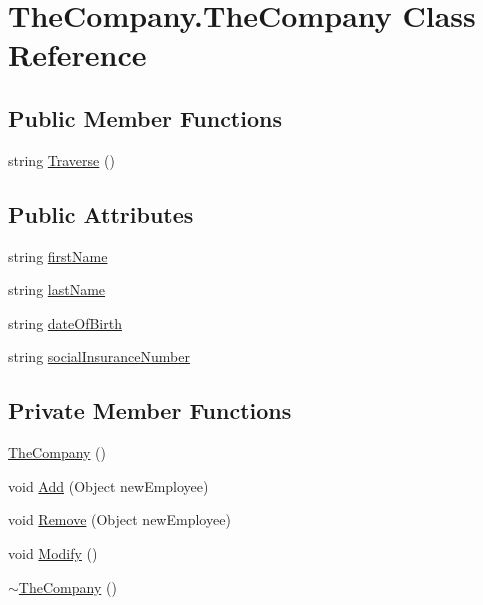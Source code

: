\hypertarget{class_the_company_1_1_the_company}{}\section{The\+Company.\+The\+Company Class Reference}
\label{class_the_company_1_1_the_company}
\subsection*{Public Member Functions}
\begin{DoxyCompactItemize}
\item 
string \hyperlink{class_the_company_1_1_the_company_aacf0493114c484ae71ec84f9e71a4fcc}{Traverse} ()
\end{DoxyCompactItemize}
\subsection*{Public Attributes}
\begin{DoxyCompactItemize}
\item 
string \hyperlink{class_the_company_1_1_the_company_a1dd223355d976eda84453285201f4c52}{first\+Name}
\item 
string \hyperlink{class_the_company_1_1_the_company_ac6cbe53e23465412765588a500a48969}{last\+Name}
\item 
string \hyperlink{class_the_company_1_1_the_company_ae783ab70914b4ddbc8b96587d77b90a2}{date\+Of\+Birth}
\item 
string \hyperlink{class_the_company_1_1_the_company_a134f847bb5b7b9475847c4c3ba27bddc}{social\+Insurance\+Number}
\end{DoxyCompactItemize}
\subsection*{Private Member Functions}
\begin{DoxyCompactItemize}
\item 
\hyperlink{class_the_company_1_1_the_company_ad19460e35fb5e70625b73b167f039dd9}{The\+Company} ()
\item 
void \hyperlink{class_the_company_1_1_the_company_a5833e204ee54a2a29a58bad183f806ff}{Add} (Object new\+Employee)
\item 
void \hyperlink{class_the_company_1_1_the_company_a49e4d55ab7932a2fd1130afd88955818}{Remove} (Object new\+Employee)
\item 
void \hyperlink{class_the_company_1_1_the_company_af4c78fc48281cbd1b3106608ed8201b5}{Modify} ()
\item 
\hyperlink{class_the_company_1_1_the_company_ac73f5199bcc3ef366a000b8ffc38a477}{$\sim$\+The\+Company} ()
\end{DoxyCompactItemize}

